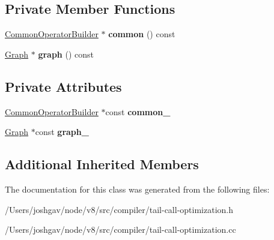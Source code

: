 \subsection*{Private Member Functions}
\begin{DoxyCompactItemize}
\item 
\hyperlink{classv8_1_1internal_1_1compiler_1_1_common_operator_builder}{Common\+Operator\+Builder} $\ast$ {\bfseries common} () const \hypertarget{classv8_1_1internal_1_1compiler_1_1_tail_call_optimization_aadfff3a74055a1bbbd90c2b5d2c7ceec}{}\label{classv8_1_1internal_1_1compiler_1_1_tail_call_optimization_aadfff3a74055a1bbbd90c2b5d2c7ceec}

\item 
\hyperlink{classv8_1_1internal_1_1compiler_1_1_graph}{Graph} $\ast$ {\bfseries graph} () const \hypertarget{classv8_1_1internal_1_1compiler_1_1_tail_call_optimization_a1692ca19b36f855c76036254f5498698}{}\label{classv8_1_1internal_1_1compiler_1_1_tail_call_optimization_a1692ca19b36f855c76036254f5498698}

\end{DoxyCompactItemize}
\subsection*{Private Attributes}
\begin{DoxyCompactItemize}
\item 
\hyperlink{classv8_1_1internal_1_1compiler_1_1_common_operator_builder}{Common\+Operator\+Builder} $\ast$const {\bfseries common\+\_\+}\hypertarget{classv8_1_1internal_1_1compiler_1_1_tail_call_optimization_ab26847d946ca6a80e65df9e024acb96f}{}\label{classv8_1_1internal_1_1compiler_1_1_tail_call_optimization_ab26847d946ca6a80e65df9e024acb96f}

\item 
\hyperlink{classv8_1_1internal_1_1compiler_1_1_graph}{Graph} $\ast$const {\bfseries graph\+\_\+}\hypertarget{classv8_1_1internal_1_1compiler_1_1_tail_call_optimization_a21f92d2b10b6ce52137b6523c81629f7}{}\label{classv8_1_1internal_1_1compiler_1_1_tail_call_optimization_a21f92d2b10b6ce52137b6523c81629f7}

\end{DoxyCompactItemize}
\subsection*{Additional Inherited Members}


The documentation for this class was generated from the following files\+:\begin{DoxyCompactItemize}
\item 
/\+Users/joshgav/node/v8/src/compiler/tail-\/call-\/optimization.\+h\item 
/\+Users/joshgav/node/v8/src/compiler/tail-\/call-\/optimization.\+cc\end{DoxyCompactItemize}
